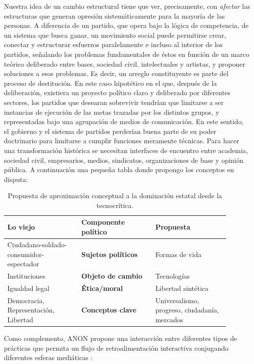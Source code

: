 Nuestra idea de un cambio estructural tiene que ver, precisamente, con \emph{afectar} las estructuras que generan opresión sistemáticamente para la mayoría de las personas. A diferencia de un partido, que opera bajo la lógica de competencia, de un sistema que busca ganar, un movimiento social puede permitirse crear, conectar y estructurar esfuerzos paralelamente e incluso al interior de los partidos, señalando los problemas fundamentales de éstos en función de un marco teórico deliberado entre bases, sociedad civil, intelectuales y artistas, y proponer soluciones a esos problemas. Es decir, un arreglo constituyente es parte del proceso de destitución. En este caso hipotético en el que, después de la deliberación, existiera un proyecto político claro y deliberado por diferentes sectores, los partidos que desearan sobrevivir tendrían que limitarse a ser instancias de ejecución de las metas trazadas por los distintos grupos, y representadas bajo una agrupación de medios de comunicación. En este sentido, el gobierno y el sistema de partidos perderían buena parte de su poder doctrinario para limitarse a cumplir funciones meramente técnicas. Para hacer una transformación histórica se necesitan interfaces de encuentro entre academia, sociedad civil, empresarios, medios, sindicatos, organizaciones de base y opinión pública. A continuación una pequeña tabla donde propongo los conceptos en disputa:

\begin{table}[htb]
  \caption{Propuesta de aproximación conceptual a la dominación estatal desde la tecnocrítica.}
  \label{tab:tablename}
  \centering
  \begin{tabular}{p{0.3\linewidth}p{0.3\linewidth}p{0.3\linewidth}}
    \toprule
    \textbf{Lo viejo} & \textbf{Componente político} & \textbf{Propuesta} \\
    \midrule
    Ciudadano-soldado-consumidor-espectador & \textbf{Sujetos políticos} & Formas de vida \\
    Instituciones & \textbf{Objeto de cambio} & Tecnologías \\
    Igualdad legal & \textbf{Ética/moral} & Libertad sintética \\
    Democracia, Representación, Libertad & \textbf{Conceptos clave} & Universalismo, progreso, ciudadanía, mercados \\
    \bottomrule
  \end{tabular}
\end{table}

Como complemento, ANON propone una interacción entre diferentes tipos de prácticas que permita un flujo de retroalimentación interactiva conjugando diferentes esferas mediáticas \autocite{AltWokeCompanion2017}:

